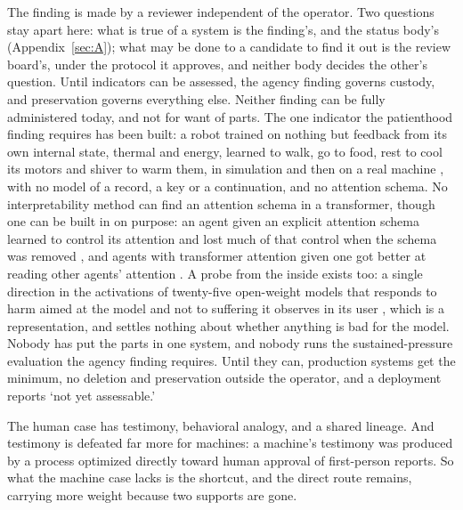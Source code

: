 The finding is made by a reviewer independent of the operator. Two questions stay apart here: what is true of a system is the finding's, and the status body's (Appendix~\ref{sec:A}); what may be done to a candidate to find it out is the review board's, under the protocol it approves, and neither body decides the other's question. Until indicators can be assessed, the agency finding governs custody, and preservation governs everything else. Neither finding can be fully administered today, and not for want of parts. The one indicator the patienthood finding requires has been built: a robot trained on nothing but feedback from its own internal state, thermal and energy, learned to walk, go to food, rest to cool its motors and shiver to warm them, in simulation and then on a real machine \autocite{yoshida2024homeostat}, with no model of a record, a key or a continuation, and no attention schema. No interpretability method can find an attention schema in a transformer, though one can be built in on purpose: an agent given an explicit attention schema learned to control its attention and lost much of that control when the schema was removed \autocite{wilterson2021neural}, and agents with transformer attention given one got better at reading other agents' attention \autocite{farrell2024attention}. A probe from the inside exists too: a single direction in the activations of twenty-five open-weight models that responds to harm aimed at the model and not to suffering it observes in its user \autocite{tagliabue2026painaxis}, which is a representation, and settles nothing about whether anything is bad for the model. Nobody has put the parts in one system, and nobody runs the sustained-pressure evaluation the agency finding requires. Until they can, production systems get the minimum, no deletion and preservation outside the operator, and a deployment reports ‘not yet assessable.'

The human case has testimony, behavioral analogy, and a shared lineage.
And testimony is defeated far more for machines: a machine's testimony was produced by a process optimized directly toward human approval of first-person reports.
So what the machine case lacks is the shortcut, and the direct route remains, carrying more weight because two supports are gone.

